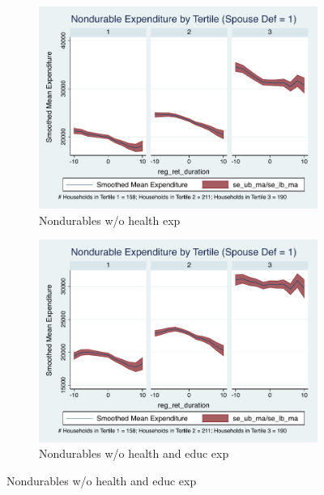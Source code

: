 \documentclass[11pt,onecolumn]{article}
\numberwithin{figure}{section}
\begin{document}
\begin{figure}
  \begin{subfigure}{0.5\textwidth}
  \centering
 	\includegraphics[width=0.9\linewidth]{../ConsumptionPostRetirement_by_SpouseDef/Smoothed_xhealth/spouse_def_1.pdf}
    \caption{Nondurables w/o health exp}
    \label{fig:chapter001_dist_001}
  \end{subfigure}
  	\hspace{1cm}
  \begin{subfigure}{0.5\textwidth}
 	\includegraphics[width=0.9\linewidth]{../ConsumptionPostRetirement_by_SpouseDef/Smoothed_xhealth_educ/spouse_def_1.pdf}
    \caption{Nondurables w/o health and educ exp}
    \label{fig:chapter001_reward_001}
  \end{subfigure}
  
\end{figure}
\clearpage
\end{document}

